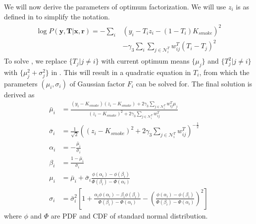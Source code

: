 We will now derive the parameters of optimum factorization. We will use $z_i$ is as defined in  to simplify the notation.
\begin{align}
    \begin{split}
    \log P \left( \mathbf{y}, \mathbf{T} | \mathbf{x}, \mathbf{r} \right) = - \sum_{i} &\left( y_i - T_i z_i - (1-T_i) K_{smoke} \right)^2 \\ &- \gamma_3 \sum_{i} \sum_{j \in \mathcal{N}_i^T}  w_{ij}^T (T_i - T_j)^2
    \end{split}
    \label{eqn:derive_1_factvbem1}
\end{align}
To solve , we replace $ \lbrace T_j | j \neq i \rbrace $ with current optimum means $ \lbrace \mu_j \rbrace$ and $ \lbrace T_j^2 | j \neq i \rbrace $ with $ \lbrace \mu_j^2 + \sigma_j^2 \rbrace $ in . This will result in a quadratic equation in $T_i$, from which the parameters $ \left( \mu_i, \sigma_i \right) $ of Gaussian factor $F_i$ can be solved for. The final solution is derived as
\begin{align}
    \bar{\mu}_i &= \frac{ \left( y_i - K_{smoke} \right) \left( z_i - K_{smoke} \right) + 2 \gamma_3 \sum_{ j \in \mathcal{N}_i^T } w_{ij}^T \mu_j } { \left( z_i - K_{smoke} \right)^2 + 2 \gamma_3 \sum_{ j \in \mathcal{N}_i^T } w_{ij}^T } \\
    \bar{\sigma}_i &= \frac{ 1 } { \sqrt{2} }\left( \left( z_i - K_{smoke} \right)^2 + 2 \gamma_3 \sum_{ j \in \mathcal{N}_i^T } w_{ij}^T \right)^{-\frac{1}{2}}  \\
    \alpha_i &= -\frac{\bar\mu_i}{\bar\sigma_i} \\
    \beta_i &= \frac{1-\bar\mu_i}{\bar\sigma_i} \\
    \mu_i &= \bar\mu_i + \bar\sigma_i \frac{\phi\left(\alpha_i \right) - \phi\left(\beta_i \right)}{\Phi\left(\beta_i \right) - \Phi\left(\alpha_i \right)} \label{eqn:mean_t_vbem1} \\
    \sigma_i &= \bar\sigma_i^2 \left[ 1 + \frac{\alpha_i \phi\left(\alpha_i \right) - \beta_i  \phi\left(\beta_i \right)}{\Phi\left(\beta_i \right) - \Phi\left(\alpha_i \right)} - \left(\frac{\phi\left(\alpha_i \right) - \phi\left(\beta_i \right)}{\Phi\left(\beta_i \right) - \Phi\left(\alpha_i \right)} \right)^2 \right] \label{eqn:std_t_vbem1}  
\end{align}
where $\phi$ and $\Phi$ are PDF and CDF of standard normal distribution. 


